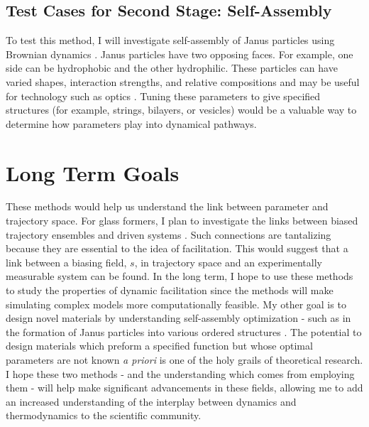 \documentclass[11pt]{article}
\begin{document}
\subsection*{Test Cases for Second Stage: Self-Assembly}
To test this method, I will investigate self-assembly of Janus particles using Brownian dynamics \cite{Jiang2007}.  Janus particles have two opposing faces. For example, one side can be hydrophobic and the other hydrophilic.  These particles can have varied shapes, interaction strengths, and relative compositions and may be useful for technology such as optics \cite{Glotzer2007}.  Tuning these parameters to give specified structures (for example, strings, bilayers, or vesicles) would be a valuable way to determine how parameters play into dynamical pathways. 

\section*{Long Term Goals}
These methods would help us understand the link between parameter and trajectory space.  For glass formers, I plan to investigate the links between biased trajectory ensembles and driven systems \cite{Speck2010}. Such connections are tantalizing because they are essential to the idea of facilitation. This would suggest that a link between a biasing field, $s$, in trajectory space and an experimentally measurable system can be found.  In the long term, I hope to use these methods to study the properties of dynamic facilitation since the methods will make simulating complex models more computationally feasible. My other goal is to  design novel materials by understanding self-assembly optimization - such as in the formation of Janus particles into various ordered structures \cite{Glotzer2007}.   The potential to design materials which preform a specified function but whose optimal parameters are not known {\it a priori} is one of the holy grails of theoretical research.  I hope these two methods - and the understanding which comes from employing them - will help make significant advancements in these fields, allowing me to add an increased understanding of the interplay between dynamics and thermodynamics to the scientific community.



\end{document}
